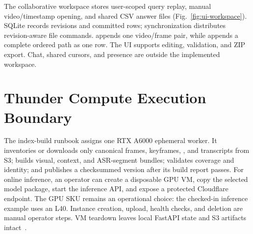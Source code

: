 The collaborative workspace stores user-scoped query replay, manual
video/timestamp opening, and shared CSV answer files
(Fig.~\ref{fig:ui-workspace}). SQLite records revisions and committed rows;
synchronization distributes revision-aware file commands. \KIS{} appends one
video/frame pair, while \TRAKE{} appends a complete ordered path as one row. The
UI supports editing, validation, and ZIP export. Chat, shared cursors, and
presence are outside the implemented workspace.

\section{Thunder Compute Execution Boundary}

The index-build runbook assigns one RTX A6000 ephemeral worker. It inventories or
downloads only canonical frames, keyframes, \FrameContext{}, and transcripts from
S3; builds visual, context, and ASR-segment bundles; validates coverage and
identity; and publishes a checksummed version after its build report passes. For
online inference, an operator can create a disposable GPU VM, copy the selected
model package, start the inference API, and expose a protected
Cloudflare endpoint. The GPU SKU remains an operational choice: the checked-in
inference example uses an L40. Instance creation, upload, health checks, and
deletion are manual operator steps. VM teardown leaves local FastAPI state and S3
artifacts intact~\cite{thunder}.

